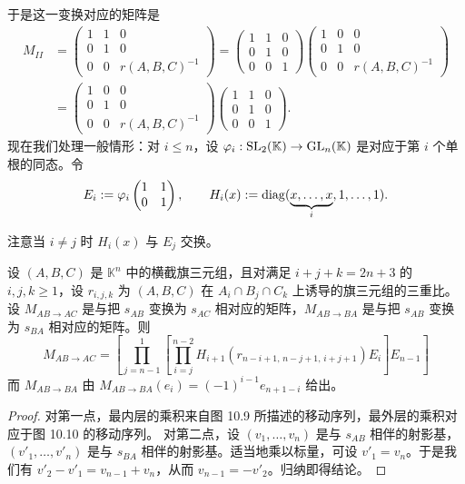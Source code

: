 于是这一变换对应的矩阵是
\begin{align*}
M_{II}&=\begin{pmatrix}1&1&0\\0&1&0\\0&0&r(A,B,C)^{-1}\end{pmatrix}
=\begin{pmatrix}1&1&0\\0&1&0\\0&0&1\end{pmatrix}
\begin{pmatrix}1&0&0\\0&1&0\\0&0&r(A,B,C)^{-1}\end{pmatrix}\\
&=\begin{pmatrix}1&0&0\\0&1&0\\0&0&r(A,B,C)^{-1}\end{pmatrix}
\begin{pmatrix}1&1&0\\0&1&0\\0&0&1\end{pmatrix}.
\end{align*}
现在我们处理一般情形：对 $i\le n$，设 $\varphi_i:\operatorname{SL}_2(\mathbb{K})\to\operatorname{GL}_n(\mathbb{K})$ 是对应于第 $i$ 个单根的同态。令
\[
E_i:=\varphi_i\begin{pmatrix}1&1\\0&1\end{pmatrix},
\qquad
H_i(x):=\operatorname{diag}(\underbrace{x,\dots,x}_{i},1,\dots,1).
\]

注意当 $i\ne j$ 时 $H_i(x)$ 与 $E_j$ 交换。

\begin{theorem}[10.28] 设 $(A,B,C)$ 是 $\mathbb{K}^n$ 中的横截旗三元组，且对满足 $i+j+k=2n+3$ 的 $i,j,k\ge1$，设 $r_{i,j,k}$ 为 $(A,B,C)$ 在 $A_i\cap B_j\cap C_k$ 上诱导的旗三元组的三重比。设 $M_{AB\to AC}$ 是与把 $s_{AB}$ 变换为 $s_{AC}$ 相对应的矩阵，$M_{AB\to BA}$ 是与把 $s_{AB}$ 变换为 $s_{BA}$ 相对应的矩阵。则
\[
M_{AB\to AC}=\left[\prod_{j=n-1}^{1}\left[\prod_{i=j}^{n-2}H_{i+1}(r_{n-i+1,\,n-j+1,\,i+j+1})E_i\right]E_{n-1}\right]
\]
而 $M_{AB\to BA}$ 由 $M_{AB\to BA}(e_i)=(-1)^{i-1}e_{n+1-i}$ 给出。
\end{theorem}

\begin{proof}
对第一点，最内层的乘积来自图 10.9 所描述的移动序列，最外层的乘积对应于图 10.10 的移动序列。
对第二点，设 $(v_1,\dots,v_n)$ 是与 $s_{AB}$ 相伴的射影基，$(v'_1,\dots,v'_n)$ 是与 $s_{BA}$ 相伴的射影基。适当地乘以标量，可设 $v'_1=v_n$。于是我们有 $v'_2-v'_1=v_{n-1}+v_n$，从而 $v_{n-1}=-v'_2$。归纳即得结论。
\end{proof}

